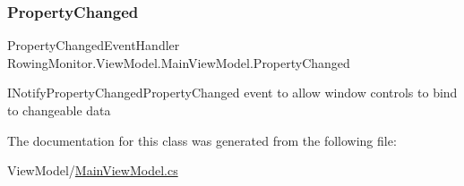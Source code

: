 \subsubsection{\texorpdfstring{Property\+Changed}{PropertyChanged}}
{\footnotesize\ttfamily Property\+Changed\+Event\+Handler Rowing\+Monitor.\+View\+Model.\+Main\+View\+Model.\+Property\+Changed}



I\+Notify\+Property\+Changed\+Property\+Changed event to allow window controls to bind to changeable data 



The documentation for this class was generated from the following file\+:\begin{DoxyCompactItemize}
\item 
View\+Model/\hyperlink{_main_view_model_8cs}{Main\+View\+Model.\+cs}\end{DoxyCompactItemize}

